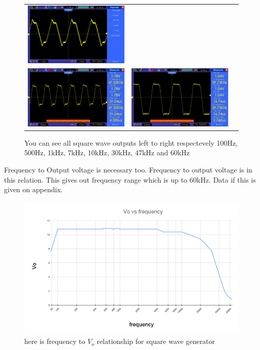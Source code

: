 \documentclass[14pt,a4paper]{extarticle}
\begin{document}
\begin{figure}[H]
\begin{tabular}{ccc}
    \includegraphics[width=.49\linewidth]{imgs/square30k.png}\\
    \includegraphics[width=.49\linewidth]{imgs/square47k.png}&
    \includegraphics[width=.49\linewidth]{imgs/square60k.png}
\end{tabular}
\vspace{0.2cm}
\caption{You can see all square wave outputs left to right respectevely 100Hz, 500Hz, 1kHz, 7kHz, 10kHz, 30kHz, 47kHz and 60kHz}
\label{fig:filters}
\end{figure}



Frequency to Output voltage is necessary too. Frequency to output voltage is in this relation. This gives out frequency range which is up to 60kHz. Data if this is given on appendix.


\begin{figure}[H]
\centering
\includegraphics[width=1\linewidth]{imgs/squaregraph.png}
\caption{here is frequency to $V_o$ relationship for square wave generator}
\end{figure}
\end{document}
